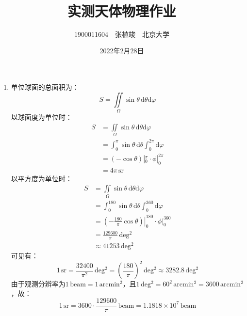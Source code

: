 \documentclass[a4paper]{article}
\begin{document}
\title{\textbf{实测天体物理作业}}
\author{1900011604\ \ 张植竣\ \ 北京大学}
\date{2022年2月28日}
\maketitle

\begin{enumerate}

    \item[1.]
    单位球面的总面积为：
    \[
        S = \iint\limits_\Omega \sin\theta\,\mathrm{d}\theta\mathrm{d}\varphi
    \]
    以球面度为单位时：
    \begin{align*}
        S
        &= \iint\limits_\Omega \sin\theta\,\mathrm{d}\theta\mathrm{d}\varphi \\
        &= \int_0^\pi \sin\theta\,\mathrm{d}\theta \int_0^{2\pi} \mathrm{d}\varphi \\
        &= (-\cos\theta)|_0^\pi \cdot \phi|_0^{2\pi} \\
        &= 4\pi\,\mathrm{sr}
    \end{align*}
    以平方度为单位时：
    \begin{align*}
        S
        &= \iint\limits_\Omega \sin\theta\,\mathrm{d}\theta\mathrm{d}\varphi \\
        &= \int_0^{180} \sin\theta\,\mathrm{d}\theta \int_0^{360} \mathrm{d}\varphi \\
        &= \left.\left(-\frac{180}{\pi}\cos\theta\right)\right|_0^{180} \cdot \phi|_0^{360} \\
        &= \frac{129600}{\pi}\,\mathrm{deg^2} \\
        &\approx 41253\,\mathrm{deg^2}
    \end{align*}
    可见有：
    \[
        1\,\mathrm{sr} = \frac{32400}{\pi^2}\,\mathrm{deg^2} = \left(\dfrac{180}{\pi}\right)^2\,\mathrm{deg^2} \approx 3282.8\,\mathrm{deg^2}
    \]
    由于观测分辨率为$1\,\mathrm{beam}=1\,\mathrm{arcmin^2}$，且$1\,\mathrm{deg^2}=60^2\,\mathrm{arcmin^2}=3600\,\mathrm{arcmin^2}$，故：
    \[
        1\,\mathrm{sr} = 3600\cdot\frac{129600}{\pi}\,\mathrm{beam} = 1.1818\times10^7\,\mathrm{beam}
    \]


\end{enumerate}
\end{document}

